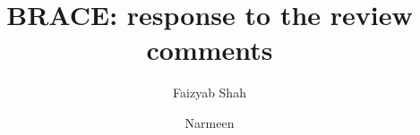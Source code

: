 \documentclass[aspectratio=169,11pt]{beamer}
\title{BRACE: response to the review comments}
\author{Faizyab Shah \and Narmeen}
\date{}
\begin{document}
\begin{frame}
  \titlepage
\end{frame}
















\end{document}
